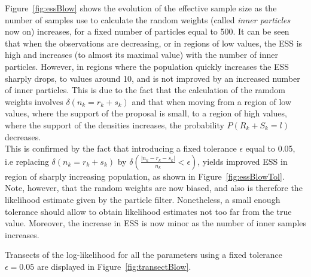\documentclass[12pt]{article}
\begin{document}
	Figure~\ref{fig:essBlow} shows the evolution of the effective sample size as the number of samples use to calculate the random weights (called \emph{inner particles} now on) increases, for a fixed number of particles equal to 500. It can be seen that when the observations are decreasing, or in regions of low values, the ESS is high and increases (to almost its maximal value) with the number of inner particles. However, in regions where the population quickly increases the ESS sharply drops, to values around 10, and is not improved by an increased number of inner particles. This is due to the fact that the calculation of the ramdom weights involves $\delta(n_k = r_k+s_k)$ and that when moving from a region of low values, where the support of the proposal is small, to a region of high values, where the support of the densities increases, the probability $P(R_k+S_k=l)$ decreases. \\
	This is confirmed by the fact that introducing a fixed tolerance $\epsilon$  equal to 0.05, i.e replacing $\delta(n_k = r_k+s_k)$ by $\delta(\frac{|n_k - r_k-s_k|}{n_k} < \epsilon)$, yields improved ESS in region of sharply increasing population, as shown in Figure~\ref{fig:essBlowTol}. Note, however, that the random weights are now biased, and also is therefore the likelihood estimate given by the particle filter. Nonetheless, a small enough tolerance should allow to obtain likelihood estimates not too far from the true value. Moreover, the increase in ESS is now minor as the number of inner samples increases.
	
	Transects of the log-likelihood for all the parameters using a fixed tolerance $\epsilon=0.05$ are displayed in Figure~\ref{fig:transectBlow}.
	
\end{document}
